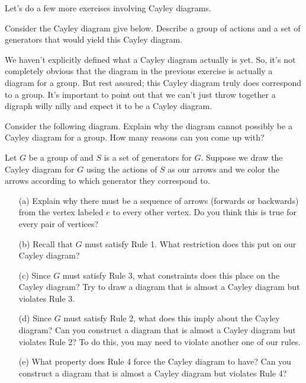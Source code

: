 Let's do a few more exercises involving Cayley diagrams.

\begin{exercise}
Consider the Cayley diagram give below.
Describe a group of actions and a set of generators that would yield this Cayley diagram.
\end{exercise}

We haven't explicitly defined what a Cayley diagram actually is yet.  So, it's not completely obvious that the diagram in the previous exercise is actually a diagram for a group.  But rest assured; this Cayley diagram truly does correspond to a group.  It's important to point out that we can't just throw together a digraph willy nilly and expect it to be a Cayley diagram.

\begin{exercise}
Consider the following diagram.
Explain why the diagram cannot possibly be a Cayley diagram for a group.  How many reasons can you come up with?
\end{exercise}

\begin{exercise}\label{exer:properties_Cayley}
Let $G$ be a group of and $S$ is a set of generators for $G$. Suppose we draw the Cayley diagram for $G$ using the actions of $S$ as our arrows and we color the arrows according to which generator they correspond to.  
\begin{enumerate}
\item[(a)] Explain why there must be a sequence of arrows (forwards or backwards) from the vertex labeled $e$ to every other vertex.  Do you think this is true for every pair of vertices?
\item[(b)] Recall that $G$ must satisfy Rule 1.  What restriction does this put on our Cayley diagram?
\item[(c)] Since $G$ must satisfy Rule 3, what constraints does this place on the Cayley diagram?  Try to draw a diagram that is almost a Cayley diagram but violates Rule 3.
\item[(d)] Since $G$ must satisfy Rule 2, what does this imply about the Cayley diagram?  Can you construct a diagram that is almost a Cayley diagram but violates Rule 2?  To do this, you may need to violate another one of our rules.
\item[(e)] What property does Rule 4 force the Cayley diagram to have?  Can you construct a diagram that is almost a Cayley diagram but violates Rule 4? 
\end{enumerate}
\end{exercise}

